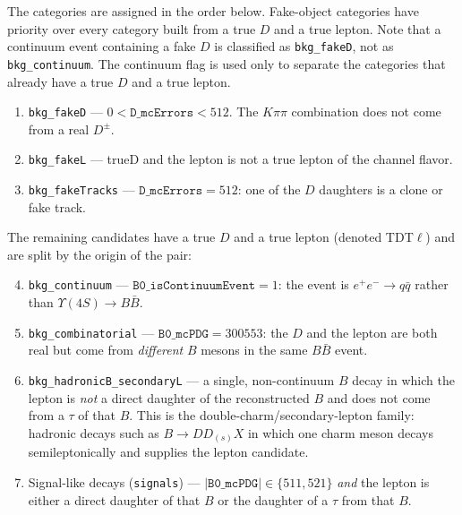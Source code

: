 The categories are assigned in the order below.
Fake-object categories have priority over every category built from a true
$D$ and a true lepton. Note that a continuum event containing a
fake $D$ is classified as \texttt{bkg\_fakeD}, not as \texttt{bkg\_continuum}.
The continuum flag is used only to separate the categories that already have
a true $D$ and a true lepton.

\begin{enumerate}
  \item \texttt{bkg\_fakeD} --- $0 < \texttt{D\_mcErrors} < 512$.
        The $K\pi\pi$ combination does not come from a real $D^{\pm}$.
  \item \texttt{bkg\_fakeL} --- trueD and the lepton is not a true lepton of
        the channel flavor.
  \item \texttt{bkg\_fakeTracks} --- $\texttt{D\_mcErrors} = 512$: one of the
        $D$ daughters is a clone or fake track.
\end{enumerate}

The remaining candidates have a true $D$ and a true lepton (denoted TDT$\ell$)
and are split by the origin of the pair:

\begin{enumerate}\setcounter{enumi}{3}
  \item \texttt{bkg\_continuum} --- $\texttt{B0\_isContinuumEvent} = 1$:
        the event is $e^{+}e^{-} \to q\bar{q}$ rather than
        $\Upsilon(4S) \to B\bar{B}$.
  \item \texttt{bkg\_combinatorial} --- $\texttt{B0\_mcPDG} = 300553$:
        the $D$ and the lepton are both real but come from \emph{different}
        $B$ mesons in the same $B\bar{B}$ event.
  \item \texttt{bkg\_hadronicB\_secondaryL} --- a single, non-continuum $B$
        decay in which the lepton is \emph{not} a direct daughter of the
        reconstructed $B$ and does not come from a $\tau$ of that $B$.
        This is the double-charm/secondary-lepton family: hadronic decays
        such as $B \to D D_{(s)} X$ in which one charm meson decays
        semileptonically and supplies the lepton candidate.
        
  \item Signal-like decays (\texttt{signals}) --- $|\texttt{B0\_mcPDG}| \in
        \{511, 521\}$ \emph{and} the lepton is either a direct daughter of
        that $B$ or the daughter of a $\tau$ from that $B$.
 
\end{enumerate}

